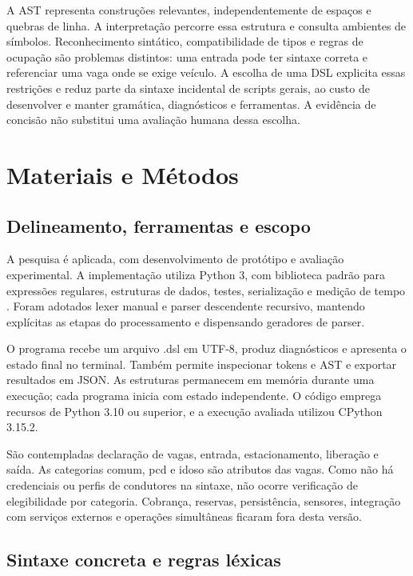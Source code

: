 \documentclass[conference,a4paper]{IEEEtran}
\begin{document}
A AST representa construções relevantes, independentemente de espaços e quebras de linha. A interpretação percorre essa estrutura e consulta ambientes de símbolos. Reconhecimento sintático, compatibilidade de tipos e regras de ocupação são problemas distintos: uma entrada pode ter sintaxe correta e referenciar uma vaga onde se exige veículo. A escolha de uma DSL explicita essas restrições e reduz parte da sintaxe incidental de scripts gerais, ao custo de desenvolver e manter gramática, diagnósticos e ferramentas. A evidência de concisão não substitui uma avaliação humana dessa escolha.

\section{Materiais e Métodos}

\subsection{Delineamento, ferramentas e escopo}

A pesquisa é aplicada, com desenvolvimento de protótipo e avaliação experimental. A implementação utiliza Python 3, com biblioteca padrão para expressões regulares, estruturas de dados, testes, serialização e medição de tempo \cite{python}. Foram adotados lexer manual e parser descendente recursivo, mantendo explícitas as etapas do processamento e dispensando geradores de parser.


O programa recebe um arquivo .dsl em UTF-8, produz diagnósticos e apresenta o estado final no terminal. Também permite inspecionar tokens e AST e exportar resultados em JSON. As estruturas permanecem em memória durante uma execução; cada programa inicia com estado independente. O código emprega recursos de Python 3.10 ou superior, e a execução avaliada utilizou CPython 3.15.2.


São contempladas declaração de vagas, entrada, estacionamento, liberação e saída. As categorias comum, pcd e idoso são atributos das vagas. Como não há credenciais ou perfis de condutores na sintaxe, não ocorre verificação de elegibilidade por categoria. Cobrança, reservas, persistência, sensores, integração com serviços externos e operações simultâneas ficaram fora desta versão.


\subsection{Sintaxe concreta e regras léxicas}
\end{document}
